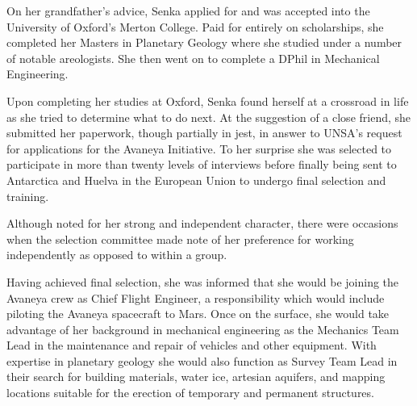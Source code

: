 On her grandfather's advice, Senka applied for and was accepted into the University of Oxford's Merton College. Paid for entirely on scholarships, she completed her Masters in Planetary Geology where she studied under a number of notable areologists. She then went on to complete a DPhil in Mechanical Engineering.

Upon completing her studies at Oxford, Senka found herself at a crossroad in life as she tried to determine what to do next. At the suggestion of a close friend, she submitted her paperwork, though partially in jest, in answer to UNSA's request for applications for the Avaneya Initiative. To her surprise she was selected to participate in more than twenty levels of interviews before finally being sent to Antarctica and Huelva in the European Union to undergo final selection and training.

Although noted for her strong and independent character, there were occasions when the selection committee made note of her preference for working independently as opposed to within a group.

Having achieved final selection, she was informed that she would be joining the Avaneya crew as Chief Flight Engineer, a responsibility which would include piloting the Avaneya spacecraft to Mars. Once on the surface, she would take advantage of her background in mechanical engineering as the Mechanics Team Lead in the maintenance and repair of vehicles and other equipment. With expertise in planetary geology she would also function as Survey Team Lead in their search for building materials, water ice, artesian aquifers, and mapping locations suitable for the erection of temporary and permanent structures.


